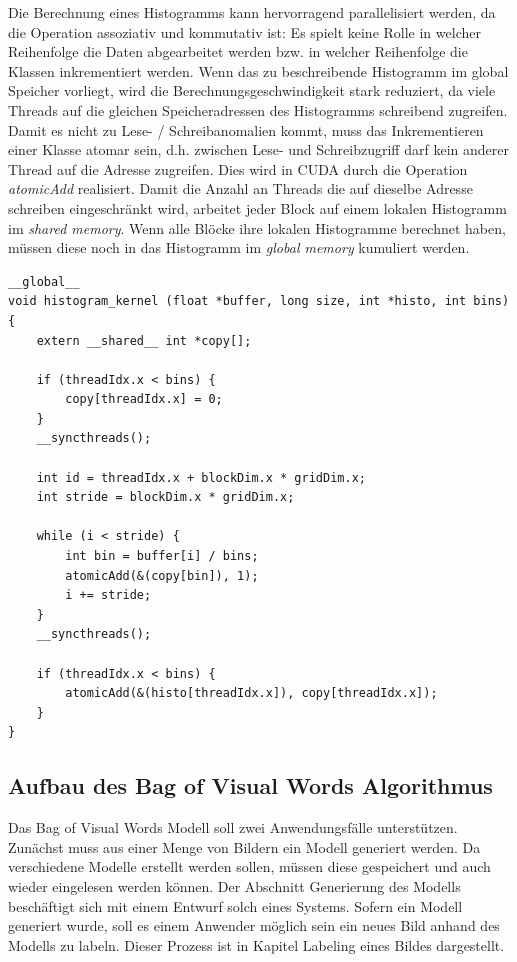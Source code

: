 Die Berechnung eines Histogramms kann hervorragend parallelisiert werden, da die Operation assoziativ und kommutativ ist: Es spielt keine Rolle in welcher Reihenfolge die Daten abgearbeitet werden bzw. in welcher Reihenfolge die Klassen inkrementiert werden. Wenn das zu beschreibende Histogramm im global Speicher vorliegt, wird die Berechnungsgeschwindigkeit stark reduziert, da viele Threads auf die gleichen Speicheradressen des Histogramms schreibend zugreifen. Damit es nicht zu Lese- / Schreibanomalien kommt, muss das Inkrementieren einer Klasse atomar sein, d.h. zwischen Lese- und Schreibzugriff darf kein anderer Thread auf die Adresse zugreifen. Dies wird in CUDA durch die Operation \textit{atomicAdd} realisiert. Damit die Anzahl an Threads die auf dieselbe Adresse schreiben eingeschränkt wird, arbeitet jeder Block auf einem lokalen Histogramm im \textit{shared memory}. Wenn alle Blöcke ihre lokalen Histogramme berechnet haben, müssen diese noch in das Histogramm im \textit{global memory} kumuliert werden.

\lstset{language=C}
\begin{lstlisting}
__global__
void histogram_kernel (float *buffer, long size, int *histo, int bins) {
	extern __shared__ int *copy[];
	
	if (threadIdx.x < bins) {
		copy[threadIdx.x] = 0;		
	}
	__syncthreads();

	int id = threadIdx.x + blockDim.x * gridDim.x;
	int stride = blockDim.x * gridDim.x;
	
	while (i < stride) {
		int bin = buffer[i] / bins; 
		atomicAdd(&(copy[bin]), 1);
		i += stride;	
	}
	__syncthreads();
	
	if (threadIdx.x < bins) {
		atomicAdd(&(histo[threadIdx.x]), copy[threadIdx.x]);		
	}
}
\end{lstlisting} 

\subsection{Aufbau des Bag of Visual Words Algorithmus}

Das Bag of Visual Words Modell soll zwei Anwendungsfälle unterstützen. Zunächst muss aus einer Menge von Bildern ein Modell generiert werden. Da verschiedene Modelle erstellt werden sollen, müssen diese gespeichert und auch wieder eingelesen werden können. Der Abschnitt Generierung des Modells beschäftigt sich mit einem Entwurf solch eines Systems. Sofern ein Modell generiert wurde, soll es einem Anwender möglich sein ein neues Bild anhand des Modells zu labeln. Dieser Prozess ist in Kapitel Labeling eines Bildes dargestellt.

